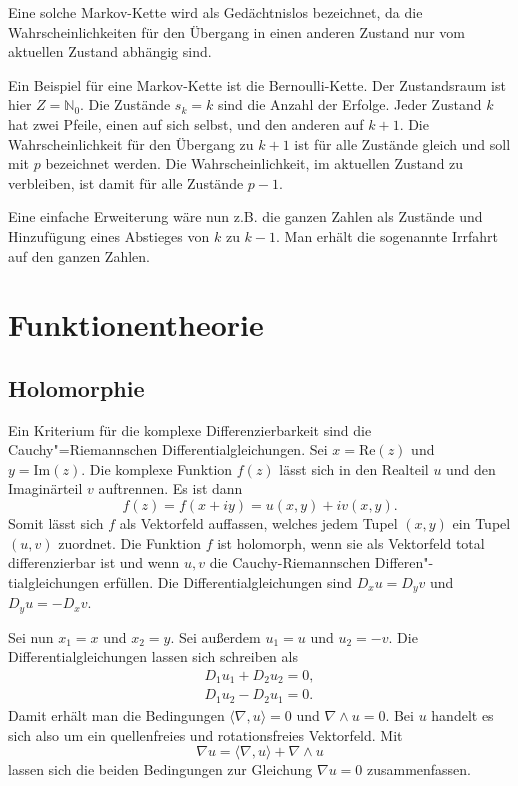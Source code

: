 \documentclass[a4paper,10pt,fleqn,twocolumn,twoside]{article}
\begin{document}
Eine solche Markov-Kette wird als Gedächtnislos bezeichnet, da
die Wahrscheinlichkeiten für den Übergang in einen anderen Zustand
nur vom aktuellen Zustand abhängig sind.

Ein Beispiel für eine Markov-Kette ist die Bernoulli-Kette.
Der Zustandsraum ist hier $Z=\mathbb{N}_0$. Die Zustände $s_k=k$
sind die Anzahl der Erfolge. Jeder Zustand $k$ hat zwei Pfeile,
einen auf sich selbst, und den anderen auf $k+1$. Die
Wahrscheinlichkeit für den Übergang zu $k+1$ ist für alle Zustände
gleich und soll mit $p$ bezeichnet werden. Die Wahrscheinlichkeit,
im aktuellen Zustand zu verbleiben, ist damit für alle
Zustände $p-1$.

Eine einfache Erweiterung wäre nun z.B. die ganzen Zahlen als
Zustände und Hinzufügung eines Abstieges von $k$ zu $k-1$.
Man erhält die sogenannte Irrfahrt auf den ganzen Zahlen.


\newpage
\section{Funktionentheorie}
\subsection{Holomorphie}

Ein Kriterium für die komplexe Differenzierbarkeit sind die
Cauchy"=Riemannschen Differentialgleichungen. Sei $x=\mathrm{Re}(z)$
und $y=\mathrm{Im}(z)$. Die komplexe Funktion $f(z)$ lässt sich
in den Realteil $u$ und den Imaginärteil $v$ auftrennen. Es ist
dann
\[f(z) = f(x+iy) = u(x,y)+iv(x,y).\]
Somit lässt sich $f$ als Vektorfeld auffassen, welches jedem Tupel
$(x,y)$ ein Tupel $(u,v)$ zuordnet. Die Funktion $f$ ist
holomorph, wenn sie als Vektorfeld total differenzierbar ist und
wenn $u,v$ die Cauchy-Riemannschen Differen"-tialgleichungen
erfüllen. Die Differentialgleichungen sind $D_x u=D_y v$ und
$D_y u = -D_x v$.

Sei nun $x_1=x$ und $x_2=y$. Sei außerdem $u_1=u$
und $u_2=-v$. Die Differentialgleichungen lassen sich schreiben als
\begin{gather*}
D_1u_1+D_2u_2=0,\\
D_1u_2-D_2u_1=0.
\end{gather*}
Damit erhält man die Bedingungen $\langle\nabla,u\rangle=0$ und
$\nabla\wedge u=0$. Bei $u$ handelt es sich also um ein
quellenfreies und rotationsfreies Vektorfeld. Mit
\[\nabla u = \langle\nabla, u\rangle+\nabla\wedge u\]
lassen sich die beiden Bedingungen zur Gleichung $\nabla u=0$
zusammenfassen.
\end{document}
